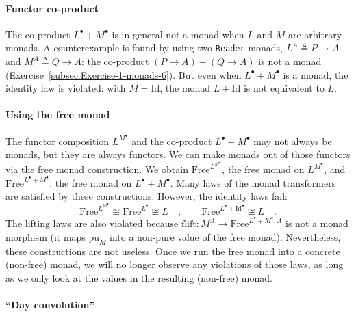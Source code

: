 \paragraph{Functor co-product}

The co-product $L^{\bullet}+M^{\bullet}$ is in general not a monad
when $L$ and $M$ are arbitrary monads. A counterexample is found
by using two \lstinline!Reader! monads, $L^{A}\triangleq P\rightarrow A$
and $M^{A}\triangleq Q\rightarrow A$: the co-product $\left(P\rightarrow A\right)+\left(Q\rightarrow A\right)$
is not a monad (Exercise~\ref{subsec:Exercise-1-monads-6}). But
even when $L^{\bullet}+M^{\bullet}$ is a monad, the identity law
is violated: with $M=\text{Id}$, the monad $L+\text{Id}$ is not
equivalent to $L$.

\paragraph{Using the free monad}

The functor composition $L^{M^{\bullet}}$ and the co-product $L^{\bullet}+M^{\bullet}$
may not always be monads, but they are always functors. We can make
monads out of those functors via the free monad construction. We obtain
$\text{Free}^{L^{M^{\bullet}}}$, the free monad on $L^{M^{\bullet}}$,
and $\text{Free}^{L^{\bullet}+M^{\bullet}}$, the free monad on $L^{\bullet}+M^{\bullet}$.
Many laws of the monad transformers are satisfied by these constructions.
However, the identity laws fail:
\[
\text{Free}^{L^{\text{Id}^{\bullet}}}\cong\text{Free}^{L^{\bullet}}\not\cong L\quad,\quad\quad\text{Free}^{L^{\bullet}+\text{Id}^{\bullet}}\not\cong L\quad.
\]
The lifting laws are also violated because $\text{flift}:M^{A}\rightarrow\text{Free}^{L^{\bullet}+M^{\bullet},A}$
is not a monad morphism (it maps $\text{pu}_{M}$ into a non-pure
value of the free monad). Nevertheless, these constructions are not
useless. Once we run the free monad into a concrete (non-free) monad,
we will no longer observe any violations of those laws, as long as
we only look at the values in the resulting (non-free) monad.

\paragraph{\textquotedblleft Day convolution\textquotedblright}

